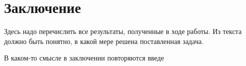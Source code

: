
\section{Заключение}

Здесь надо перечислить все результаты, полученные в ходе работы. Из текста должно быть понятно, в какой мере решена поставленная задача.

В каком-то смысле в заключении повторяются введе